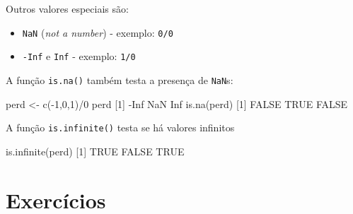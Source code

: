 \documentclass[
  10pt,
  a4paper]{book}
\newenvironment{Shaded}{\begin{snugshade}}{\end{snugshade}}
\newcommand{\ConstantTok}[1]{\textcolor[rgb]{0.00,0.00,0.00}{#1}}
\newcommand{\DecValTok}[1]{\textcolor[rgb]{0.00,0.00,0.81}{#1}}
\newcommand{\FunctionTok}[1]{\textcolor[rgb]{0.00,0.00,0.00}{#1}}
\newcommand{\NormalTok}[1]{#1}
\newcommand{\OtherTok}[1]{\textcolor[rgb]{0.56,0.35,0.01}{#1}}
\newcommand{\SpecialCharTok}[1]{\textcolor[rgb]{0.00,0.00,0.00}{#1}}
\providecommand{\tightlist}{%
  \setlength{\itemsep}{0pt}\setlength{\parskip}{0pt}}
\begin{document}
Outros valores especiais são:

\begin{itemize}
\tightlist
\item
  \texttt{NaN} (\emph{not a number}) - exemplo: \texttt{0/0}
\item
  \texttt{-Inf} e \texttt{Inf} - exemplo: \texttt{1/0}
\end{itemize}

A função \texttt{is.na()} também testa a presença de \texttt{NaN}s:

\begin{Shaded}
\begin{Highlighting}[]
\NormalTok{perd }\OtherTok{\textless{}{-}} \FunctionTok{c}\NormalTok{(}\SpecialCharTok{{-}}\DecValTok{1}\NormalTok{,}\DecValTok{0}\NormalTok{,}\DecValTok{1}\NormalTok{)}\SpecialCharTok{/}\DecValTok{0}
\NormalTok{perd}
\NormalTok{[}\DecValTok{1}\NormalTok{] }\SpecialCharTok{{-}}\ConstantTok{Inf}  \ConstantTok{NaN}  \ConstantTok{Inf}
\FunctionTok{is.na}\NormalTok{(perd)}
\NormalTok{[}\DecValTok{1}\NormalTok{] }\ConstantTok{FALSE}  \ConstantTok{TRUE} \ConstantTok{FALSE}
\end{Highlighting}
\end{Shaded}

A função \texttt{is.infinite()} testa se há valores infinitos

\begin{Shaded}
\begin{Highlighting}[]
\FunctionTok{is.infinite}\NormalTok{(perd)}
\NormalTok{[}\DecValTok{1}\NormalTok{]  }\ConstantTok{TRUE} \ConstantTok{FALSE}  \ConstantTok{TRUE}
\end{Highlighting}
\end{Shaded}

\hypertarget{exercuxedcios-3}{%
\section*{Exercícios}\label{exercuxedcios-3}}
\end{document}
